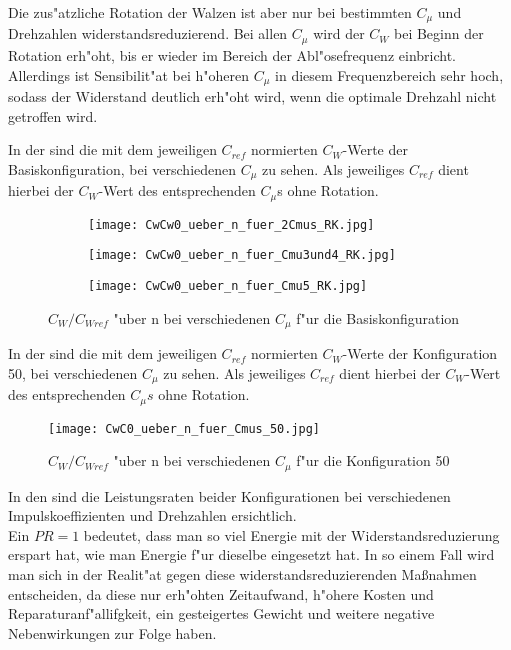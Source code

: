 Die zus"atzliche Rotation der Walzen ist aber nur bei bestimmten $C_{\mu}$ und Drehzahlen widerstandsreduzierend. Bei allen $C_{\mu}$ wird der $C_{W}$ bei Beginn der Rotation erh"oht, bis er wieder im Bereich der Abl"osefrequenz einbricht. Allerdings ist Sensibilit"at bei h"oheren $C_{\mu}$ in diesem Frequenzbereich sehr hoch, sodass der Widerstand deutlich erh"oht wird, wenn die optimale Drehzahl nicht getroffen wird.

In der  sind die mit dem jeweiligen $C_{ref}$ normierten $C_{W}$-Werte der Basiskonfiguration, bei verschiedenen $C_{\mu}$ zu sehen.
Als jeweiliges $C_{ref}$ dient hierbei der $C_{W}$-Wert des entsprechenden $C_{\mu}$s ohne Rotation.


\begin{figure}[h]
	\centering
	\begin{subfigure}[c]{0.45\textwidth}		
		\texttt{[image: CwCw0\_ueber\_n\_fuer\_2Cmus\_RK.jpg]}
	\end{subfigure}
	\begin{subfigure}[c]{0.45\textwidth}
		\texttt{[image: CwCw0\_ueber\_n\_fuer\_Cmu3und4\_RK.jpg]}
	\end{subfigure}
	\begin{subfigure}[c]{0.45\textwidth}
		\texttt{[image: CwCw0\_ueber\_n\_fuer\_Cmu5\_RK.jpg]}
	\end{subfigure}
	\caption{$C_{W}/C_{Wref}$ "uber n bei verschiedenen $C_{\mu}$ f"ur die Basiskonfiguration}
	\label{fig:CwCwref/n Cmu RK}
\end{figure}

In der  sind die mit dem jeweiligen $C_{ref}$ normierten $C_{W}$-Werte der Konfiguration 50, bei verschiedenen $C_{\mu}$ zu sehen.
Als jeweiliges $C_{ref}$ dient hierbei der $C_{W}$-Wert des entsprechenden $C_{\mu}s$ ohne Rotation.

\begin{figure}[h]
	\centering
	\texttt{[image: CwC0\_ueber\_n\_fuer\_Cmus\_50.jpg]}
	\caption{$C_{W}/C_{Wref}$ "uber n bei verschiedenen $C_{\mu}$ f"ur die Konfiguration 50}
	\label{fig:CwCwref/n Cmu 50}
\end{figure}

In den  sind die Leistungsraten beider Konfigurationen bei verschiedenen Impulskoeffizienten und Drehzahlen ersichtlich.\\
Ein $PR= 1$ bedeutet, dass man so viel Energie mit der Widerstandsreduzierung erspart hat, wie man Energie f"ur dieselbe eingesetzt hat. In so einem Fall wird man sich in der Realit"at gegen diese widerstandsreduzierenden Ma\ss{}nahmen entscheiden, da diese nur erh"ohten Zeitaufwand, h"ohere Kosten und Reparaturanf"allifgkeit, ein gesteigertes Gewicht und weitere negative Nebenwirkungen zur Folge haben.


